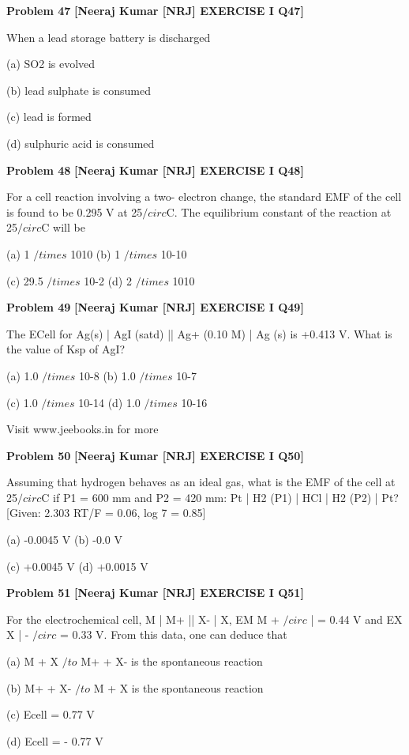 \begin{problembox}
\textbf{Problem 47} \hfill \textbf{[Neeraj Kumar [NRJ] EXERCISE I Q47]}
\label{q:ext-nrj_all_questions-47}

When a lead storage battery is discharged
 
 (a) SO2 is evolved
 
 (b) lead sulphate is consumed
 
 (c) lead is formed
 
 (d) sulphuric acid is consumed
\end{problembox}

\begin{problembox}
\textbf{Problem 48} \hfill \textbf{[Neeraj Kumar [NRJ] EXERCISE I Q48]}
\label{q:ext-nrj_all_questions-48}

For a cell reaction involving a two- electron 
change, the standard EMF of the cell is found to 
be 0.295 V at 25$/circ$C. The equilibrium constant of 
the reaction at 25$/circ$C will be
 
 (a) 1 $/times$ 1010 
(b) 1 $/times$ 10-10
 
 (c) 29.5 $/times$ 10-2 
(d) 2 $/times$ 1010
\end{problembox}

\begin{problembox}
\textbf{Problem 49} \hfill \textbf{[Neeraj Kumar [NRJ] EXERCISE I Q49]}
\label{q:ext-nrj_all_questions-49}

The ECell for Ag(s) | AgI (satd) || Ag+ (0.10  M) | Ag 
(s) is +0.413 V. What is the value of Ksp of AgI?
 
 (a) 1.0 $/times$ 10-8 
(b) 1.0 $/times$ 10-7
 
 (c) 1.0 $/times$ 10-14 
(d) 1.0 $/times$ 10-16
 
 
Visit www.jeebooks.in for more
\end{problembox}

\begin{problembox}
\textbf{Problem 50} \hfill \textbf{[Neeraj Kumar [NRJ] EXERCISE I Q50]}
\label{q:ext-nrj_all_questions-50}

Assuming that hydrogen behaves as an ideal gas, 
what is the EMF of the cell at 25$/circ$C if P1 = 600 mm 
and P2 = 420 mm: Pt | H2 (P1) | HCl | H2 (P2) | Pt? 
[Given: 2.303 RT/F = 0.06, log 7 = 0.85]
 
 (a) -0.0045 V 
(b) -0.0 V
 
 (c) +0.0045 V 
(d) +0.0015 V
\end{problembox}

\begin{problembox}
\textbf{Problem 51} \hfill \textbf{[Neeraj Kumar [NRJ] EXERCISE I Q51]}
\label{q:ext-nrj_all_questions-51}

For the electrochemical cell, M | M+ || X-  |  X, 
EM
M
+
$/circ$
| = 0.44 V and EX X
|
-
$/circ$
= 0.33 V. From this data, 
one can deduce that
 
 (a)  M + X $/to$ M+ + X- is the spontaneous reaction
 
 (b)  M+ + X- $/to$ M + X is the spontaneous reaction
 
 (c) Ecell = 0.77 V
 
 (d) Ecell = - 0.77 V
\end{problembox}

